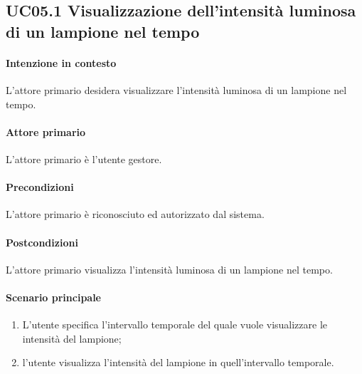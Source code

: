 \subsection{UC05.1 Visualizzazione dell'intensità luminosa di un lampione nel tempo}
\paragraph{Intenzione in contesto} L'attore primario desidera visualizzare l'intensità luminosa di un lampione nel tempo.

\paragraph{Attore primario} L'attore primario è l'utente gestore.
\paragraph{Precondizioni}L'attore primario è riconosciuto ed autorizzato dal sistema.
\paragraph{Postcondizioni} L'attore primario visualizza l'intensità luminosa di un lampione nel tempo.

\paragraph{Scenario principale}
\begin{enumerate}
    \item L'utente specifica l'intervallo temporale del quale vuole visualizzare le intensità del lampione;
    \item l'utente visualizza l'intensità del lampione in quell'intervallo temporale.
\end{enumerate}